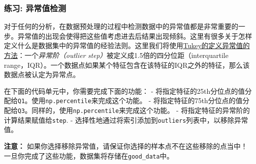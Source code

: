 \documentclass[11pt]{article}
\begin{document}
    
    \subsubsection{练习:
异常值检测}\label{ux7ec3ux4e60-ux5f02ux5e38ux503cux68c0ux6d4b}

对于任何的分析，在数据预处理的过程中检测数据中的异常值都是非常重要的一步。异常值的出现会使得把这些值考虑进去后结果出现倾斜。这里有很多关于怎样定义什么是数据集中的异常值的经验法则。这里我们将使用\href{http://datapigtechnologies.com/blog/index.php/highlighting-outliers-in-your-data-with-the-tukey-method/}{Tukey的定义异常值的方法}：一个\emph{异常阶（outlier
step）}被定义成1.5倍的四分位距（interquartile
range，IQR）。一个数据点如果某个特征包含在该特征的IQR之外的特征，那么该数据点被认定为异常点。

在下面的代码单元中，你需要完成下面的功能： -
将指定特征的25th分位点的值分配给\texttt{Q1}。使用\texttt{np.percentile}来完成这个功能。
-
将指定特征的75th分位点的值分配给\texttt{Q3}。同样的，使用\texttt{np.percentile}来完成这个功能。
- 将指定特征的异常阶的计算结果赋值给\texttt{step}. -
选择性地通过将索引添加到\texttt{outliers}列表中，以移除异常值。

\textbf{注意：}
如果你选择移除异常值，请保证你选择的样本点不在这些移除的点当中！
一旦你完成了这些功能，数据集将存储在\texttt{good\_data}中。
\end{document}
